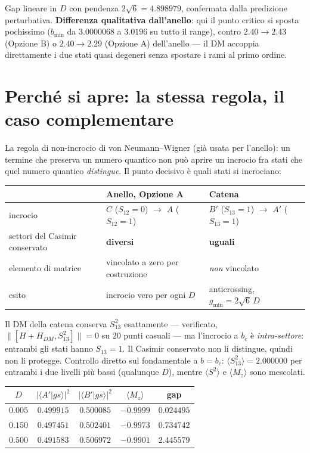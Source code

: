 \documentclass[11pt,a4paper]{article}
\begin{document}
Gap lineare in $D$ con pendenza $2\sqrt6=4.898979$, confermata dalla predizione
perturbativa. \textbf{Differenza qualitativa dall'anello}: qui il punto critico si
sposta pochissimo ($b_\text{min}$ da $3.0000068$ a $3.0196$ su tutto il range),
contro $2.40\to2.43$ (Opzione B) o $2.40\to2.29$ (Opzione A) dell'anello — il DM
accoppia direttamente i due stati quasi degeneri senza spostare i rami al primo
ordine.

\section{Perché si apre: la stessa regola, il caso complementare}

La regola di non-incrocio di von Neumann--Wigner (già usata per l'anello): un
termine che preserva un numero quantico non può aprire un incrocio fra stati che
quel numero quantico \emph{distingue}. Il punto decisivo è quali stati si
incrociano:

\begin{center}
\renewcommand{\arraystretch}{1.4}
\begin{tabular}{@{}p{3.4cm}p{5.6cm}p{5.6cm}@{}}
\toprule
& \textbf{Anello, Opzione A} & \textbf{Catena} \\
\midrule
incrocio & $C$ ($S_{12}{=}0$) $\to$ $A$ ($S_{12}{=}1$) & $B'$ ($S_{13}{=}1$) $\to$
$A'$ ($S_{13}{=}1$) \\
settori del Casimir conservato & \textbf{diversi} & \textbf{uguali} \\
elemento di matrice & vincolato a zero per costruzione & \emph{non} vincolato \\
esito & incrocio vero per ogni $D$ & anticrossing, $g_\text{min}=2\sqrt6\,D$ \\
\bottomrule
\end{tabular}
\end{center}

Il DM della catena conserva $S_{13}^2$ esattamente — verificato,
$\|[H+H_{DM},S_{13}^2]\|=0$ su 20 punti casuali — ma l'incrocio a $b_c$ è
\emph{intra-settore}: entrambi gli stati hanno $S_{13}=1$. Il Casimir conservato non
li distingue, quindi non li protegge. Controllo diretto sul fondamentale a $b=b_c$:
$\langle S_{13}^2\rangle=2.000000$ per entrambi i due livelli più bassi (qualunque
$D$), mentre $\langle S^2\rangle$ e $\langle M_z\rangle$ sono mescolati.

\begin{center}
\renewcommand{\arraystretch}{1.3}
\begin{tabular}{ccccc}
\toprule
$D$ & $|\langle A'|gs\rangle|^2$ & $|\langle B'|gs\rangle|^2$ & $\langle M_z\rangle$ &
gap \\
\midrule
$0.005$ & $0.499915$ & $0.500085$ & $-0.9999$ & $0.024495$ \\
$0.150$ & $0.497451$ & $0.502401$ & $-0.9973$ & $0.734742$ \\
$0.500$ & $0.491583$ & $0.506972$ & $-0.9901$ & $2.445579$ \\
\bottomrule
\end{tabular}
\end{center}
\end{document}
